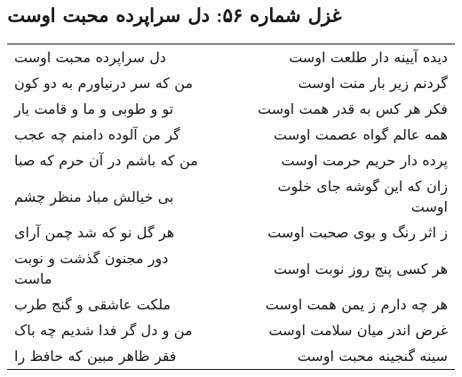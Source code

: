 \begin{center}
\section*{غزل شماره ۵۶: دل سراپرده محبت اوست}
\label{sec:sh056}
\begin{longtable}{l p{0.5cm} r}
دل سراپرده محبت اوست
&&
دیده آیینه دار طلعت اوست
\\
من که سر درنیاورم به دو کون
&&
گردنم زیر بار منت اوست
\\
تو و طوبی و ما و قامت یار
&&
فکر هر کس به قدر همت اوست
\\
گر من آلوده دامنم چه عجب
&&
همه عالم گواه عصمت اوست
\\
من که باشم در آن حرم که صبا
&&
پرده دار حریم حرمت اوست
\\
بی خیالش مباد منظر چشم
&&
زان که این گوشه جای خلوت اوست
\\
هر گل نو که شد چمن آرای
&&
ز اثر رنگ و بوی صحبت اوست
\\
دور مجنون گذشت و نوبت ماست
&&
هر کسی پنج روز نوبت اوست
\\
ملکت عاشقی و گنج طرب
&&
هر چه دارم ز یمن همت اوست
\\
من و دل گر فدا شدیم چه باک
&&
غرض اندر میان سلامت اوست
\\
فقر ظاهر مبین که حافظ را
&&
سینه گنجینه محبت اوست
\\
\end{longtable}
\end{center}
